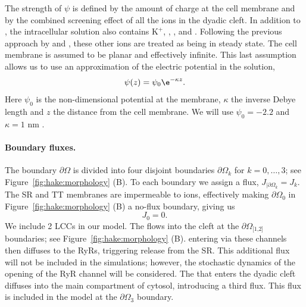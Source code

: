 The strength of $\psi$ is defined by the amount of charge at the cell
membrane and by the combined screening effect of all the ions in the
dyadic cleft. In addition to \Ca, the intracellular solution also
contains \ensuremath{\mbox{K}^{+}}, \Na, \Cl, and \Mg. Following the
previous approach by \citet{LangnerCafisoMarceljaEtAl1990} and
\citet{SoellerCannell1997}, these other ions are treated as being in
steady state. The cell membrane is assumed to be planar and
effectively infinite. This last assumption allows us to use an
approximation of the electric potential in the solution,
\begin{equation}
  \label{eq:hake:electric_potential}
  \psi(z) = \psi_0\e^{-\kappa{}z}.
\end{equation}
Here $\psi_0$ is the non-dimensional potential at the membrane,
$\kappa$ the inverse Debye length and $z$ the distance from the cell
membrane. We will use $\psi_0=-2.2$ and $\kappa=1$ nm
\citep{SoellerCannell1997}.

\paragraph{Boundary fluxes.}

The boundary $\partial\Omega$ is divided into four disjoint boundaries
$\partial\Omega_k$ for $k=0,\ldots,3$; see
Figure~\ref{fig:hake:morphology} (B). To each boundary we assign
a flux, $J_{|\partial\Omega_k}=J_k$. The SR and TT membranes are
impermeable to ions, effectively making
$\partial\Omega_{\scriptscriptstyle\text{0}}$ in
Figure~\ref{fig:hake:morphology} (B) a no-flux boundary, giving us
\begin{equation}
  \label{eq:hake:no-flux}
  J_{\scriptscriptstyle 0}= 0.
\end{equation}
We include 2 LCCs in our model. The \Ca flows into the cleft at the
$\partial\Omega_{\scriptscriptstyle\text{[1,2]}}$ boundaries; see
Figure~\ref{fig:hake:morphology} (B). \Ca entering via these
channels then diffuses to the RyRs, triggering \Ca release from the
SR. This additional \Ca flux will not be included in the simulations;
however, the stochastic dynamics of the opening of the RyR channel
will be considered. The \Ca that enters the dyadic cleft diffuses into
the main compartment of cytosol, introducing a third flux. This flux
is included in the model at the
$\partial\Omega_{\scriptscriptstyle\text{3}}$ boundary.

